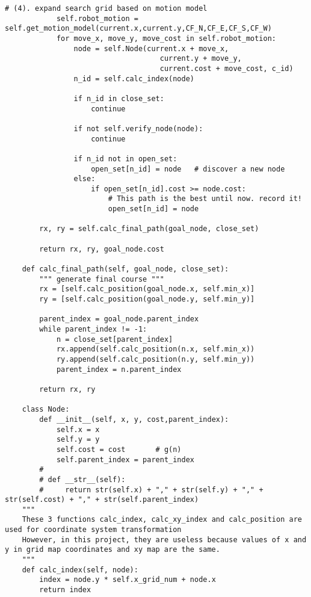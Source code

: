 \begin{lstlisting}[caption=Function for finding the efficient path under a given speed (\autoref{Pathfinding}), label=moddijk]
            # (4). expand search grid based on motion model
            self.robot_motion = self.get_motion_model(current.x,current.y,CF_N,CF_E,CF_S,CF_W)
            for move_x, move_y, move_cost in self.robot_motion:
                node = self.Node(current.x + move_x,
                                    current.y + move_y,
                                    current.cost + move_cost, c_id)
                n_id = self.calc_index(node)

                if n_id in close_set:
                    continue

                if not self.verify_node(node):
                    continue

                if n_id not in open_set:
                    open_set[n_id] = node   # discover a new node
                else:
                    if open_set[n_id].cost >= node.cost:
                        # This path is the best until now. record it!
                        open_set[n_id] = node

        rx, ry = self.calc_final_path(goal_node, close_set)

        return rx, ry, goal_node.cost

    def calc_final_path(self, goal_node, close_set):
        """ generate final course """
        rx = [self.calc_position(goal_node.x, self.min_x)]
        ry = [self.calc_position(goal_node.y, self.min_y)]
        
        parent_index = goal_node.parent_index
        while parent_index != -1:
            n = close_set[parent_index]
            rx.append(self.calc_position(n.x, self.min_x))
            ry.append(self.calc_position(n.y, self.min_y))
            parent_index = n.parent_index
            
        return rx, ry

    class Node:
        def __init__(self, x, y, cost,parent_index):
            self.x = x      
            self.y = y      
            self.cost = cost       # g(n)
            self.parent_index = parent_index    
        #
        # def __str__(self):
        #     return str(self.x) + "," + str(self.y) + "," + str(self.cost) + "," + str(self.parent_index)
    """ 
    These 3 functions calc_index, calc_xy_index and calc_position are used for coordinate system transformation
    However, in this project, they are useless because values of x and y in grid map coordinates and xy map are the same.
    """
    def calc_index(self, node):
        index = node.y * self.x_grid_num + node.x
        return index


\end{lstlisting}
